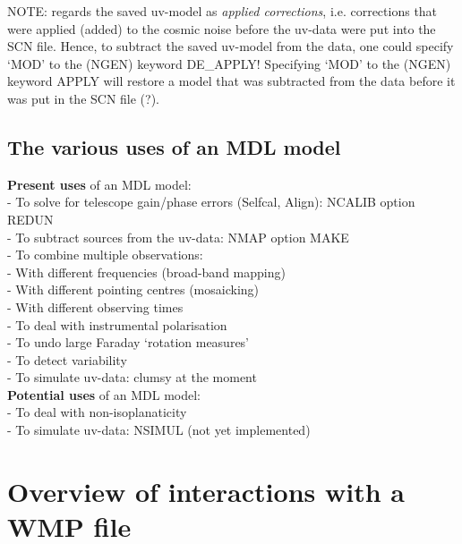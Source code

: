 	NOTE: \NEWSTAR regards the saved uv-model as {\em applied corrections},
i.e.  corrections that were applied (added) to the cosmic noise before the
uv-data were put into the SCN file.  Hence, to subtract the saved uv-model from
the data, one could specify `MOD' to the (NGEN) keyword DE\_APPLY! Specifying
`MOD' to the (NGEN) keyword APPLY will restore a model that was subtracted from
the data before it was put in the SCN file (?). 

\subsection{The various uses of an MDL model} 
\label{mdl.uses} 

{\bf Present uses} of an MDL model:\\ 
- To solve for telescope gain/phase errors (Selfcal, Align): 
	NCALIB option REDUN\\ 
- To subtract sources from the uv-data: NMAP option MAKE\\ 
- To combine multiple observations:\\ 
\hspace*{5mm} - With different frequencies (broad-band mapping)\\ 
\hspace*{5mm} - With different pointing centres (mosaicking)\\ 
\hspace*{5mm} - With different observing times\\ 
- To deal with instrumental polarisation\\ 
- To undo large Faraday `rotation measures'\\ 
- To detect variability \\ 
- To simulate uv-data: clumsy at the moment\\ 


{\bf Potential uses} of an MDL model:\\ 
- To deal with non-isoplanaticity\\ 
- To simulate uv-data: NSIMUL (not yet implemented)\\ 



\section{Overview of interactions with a WMP file}
\label{wmp.inter} 

